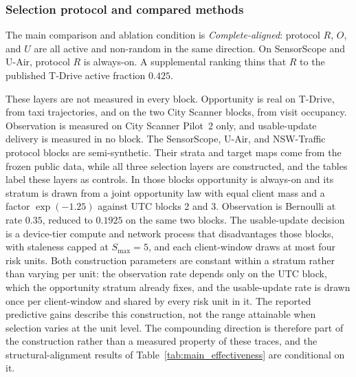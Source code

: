 \documentclass[letterpaper,journal]{IEEEtran}
\begin{document}
\subsubsection{Selection protocol and compared methods}

The main comparison and ablation condition is \emph{Complete-aligned}: protocol $R$, $O$,
and $U$ are all active and non-random in the same direction.  On
SensorScope and U-Air, protocol $R$ is always-on.  A supplemental ranking
thins that $R$ to the published T-Drive active fraction $0.425$.

These layers are not measured in every block.  Opportunity is real on T-Drive,
from taxi trajectories, and on the two City Scanner blocks, from visit
occupancy.  Observation is measured on City Scanner Pilot~2 only, and
usable-update delivery is measured in no block.  The SensorScope, U-Air, and
NSW-Traffic protocol blocks are semi-synthetic.  Their strata and target maps
come from the frozen public data, while all three selection layers are
constructed, and the tables label these layers as controls.  In those blocks
opportunity is always-on and its stratum is drawn from a joint opportunity law
with equal client mass and a factor $\exp(-1.25)$ against UTC blocks 2 and 3.
Observation is Bernoulli at rate $0.35$, reduced to $0.1925$ on the same two
blocks.  The usable-update decision is a device-tier compute and network
process that disadvantages those blocks, with staleness capped at
$S_{\max}=5$, and each client-window draws at most four risk units.  Both
construction parameters are constant within a stratum rather than varying per
unit: the observation rate depends only on the UTC block, which the
opportunity stratum already fixes, and the usable-update rate is drawn once
per client-window and shared by every risk unit in it.  The reported
predictive gains describe this construction, not the range attainable when
selection varies at the unit level.  The
compounding direction is therefore part of the construction rather than a
measured property of these traces, and the structural-alignment results of
Table~\ref{tab:main_effectiveness} are conditional on it.
\end{document}
